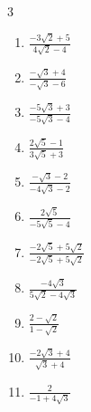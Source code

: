 \begin{multicols}{3}
\begin{enumerate}
  \item $\displaystyle \frac{-3\sqrt{2}+5}{4\sqrt{2}-4}$


  \item $\displaystyle \frac{-\sqrt{3}+4}{-\sqrt{3}-6}$


  \item $\displaystyle \frac{-5\sqrt{3}+3}{-5\sqrt{3}-4}$


\columnbreak %

\resetques

  \item $\displaystyle \frac{2\sqrt{5}-1}{3\sqrt{5}+3}$


  \item $\displaystyle \frac{-\sqrt{3}-2}{-4\sqrt{3}-2}$


  \item $\displaystyle \frac{2\sqrt{5}}{-5\sqrt{5}-4}$


  \item $\displaystyle \frac{-2\sqrt{5}+5\sqrt{2}}{-2\sqrt{5}+5\sqrt{2}}$

        \phantom{$\displaystyle =1$}

  \item $\displaystyle \frac{-4\sqrt{3}}{5\sqrt{2}-4\sqrt{3}}$


\columnbreak %

  \item $\displaystyle \frac{2-\sqrt{2}}{1-\sqrt{2}}$


  \item $\displaystyle \frac{-2\sqrt{3}+4}{\sqrt{3}+4}$


  \item $\displaystyle \frac{2}{-1+4\sqrt{3}}$


\end{enumerate}
\end{multicols}
